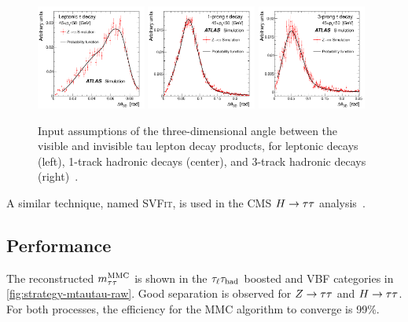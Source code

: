 \begin{figure}[tp]
  \centering
  \includegraphics[width=0.32\textwidth]{figures/ATLAS-CONF-2011-132/fig_01a}
  \includegraphics[width=0.32\textwidth]{figures/ATLAS-CONF-2011-132/fig_01b}
  \includegraphics[width=0.32\textwidth]{figures/ATLAS-CONF-2011-132/fig_01c}
  \caption{Input assumptions of the three-dimensional angle between the visible and invisible tau lepton decay products, for leptonic decays (left), 1-track hadronic decays (center), and 3-track hadronic decays (right)~\cite{ATLAS-CONF-2011-132}.}
  \label{fig:strategy-mtautau-inputs}
\end{figure}

A similar technique, named \textsc{SVFit}, is used in the CMS $H\rightarrow\tau\tau$ analysis~\cite{2014.cms-htautau}.

\subsection{Performance}
\label{sec:strategy-mtautau-performance}

The reconstructed $m_{\tau\tau}^\text{MMC}$ is shown in the $\tau_\ell\tau_\text{had}$ boosted and VBF categories in \cref{fig:strategy-mtautau-raw}. Good separation is observed for $Z\rightarrow\tau\tau$ and $H\rightarrow\tau\tau$. For both processes, the efficiency for the MMC algorithm to converge is 99\%.

